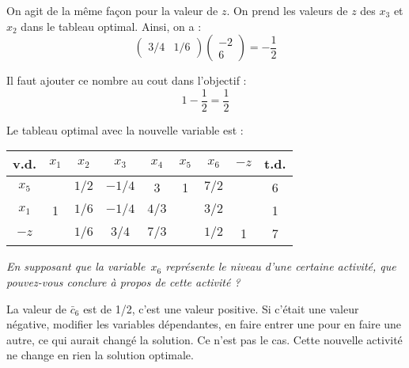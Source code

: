On agit de la même façon pour la valeur de $z$. On prend les valeurs de $z$ des $x_3$ et $x_2$ dans le tableau optimal. Ainsi, on a :
\[
\begin{pmatrix}
3/4 & 1/6 
\end{pmatrix}
\begin{pmatrix}
-2 \\
6
\end{pmatrix}
=
-\frac{1}{2}
\]

Il faut ajouter ce nombre au cout dans l’objectif :
\[1 -\frac{1}{2} = \frac{1}{2}\]

Le tableau optimal avec la nouvelle variable est :

\begin{center}
	\renewcommand{\arraystretch}{1.5}
	\begin{tabular}{|c|ccccccc|c|}
		\hline
		 v.d.   & $x_{1}$ & $x_{2}$ & $x_{3}$ & $x_{4}$ & $x_{5}$ & $x_{6}$ & $-z$ & t.d. \\ \hline
		$x_{5}$ &         &  $1/2$  & $- 1/4$ &    3    &    1    &  $7/2$  &      &  6   \\
		$x_{1}$ &    1    &  $1/6$  & $- 1/4$ &  $4/3$  &         &  $3/2$  &      &  1   \\ \hline
		 $-z$   &         &  $1/6$  &  $3/4$  &  $7/3$  &         &  $1/2$  &  1   &  7   \\ \hline
	\end{tabular}
\end{center}

\emph{En supposant que la variable~$x_6$ représente le niveau d’une certaine activité, que pouvez-vous conclure à propos de cette activité ?}

La valeur de $\bar{c}_6$ est de 1/2, c’est une valeur positive. Si c’était une valeur négative, modifier les variables dépendantes, en faire entrer une pour en faire une autre, ce qui aurait changé la solution. Ce n’est pas le cas. Cette nouvelle activité ne change en rien la solution optimale.

